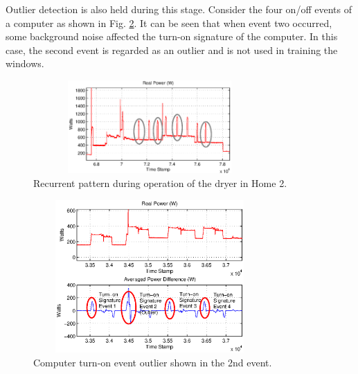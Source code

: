 \documentclass[conference]{IEEEtran}
\begin{document}
Outlier detection is also held during this stage.  Consider the four on/off events of a computer as shown in Fig. \ref{fig:outlier}.  It can be seen that when event two occurred, some background noise affected the turn-on signature of the computer.  In this case, the second event is regarded as an outlier and is not used in training the windows.  

\begin{figure}[!t]
	\centering
	\includegraphics[height = 1.4in, width=3.5in]{fig/dryerH2.eps}
	\caption{Recurrent pattern during operation of the dryer in Home 2.}
	\label{fig:dryerH2}
\end{figure}
	
\begin{figure}[!t]
	\centering
	\includegraphics[height = 2.3in, width=3.5in]{fig/outlier.eps}
	\caption{Computer turn-on event outlier shown in the 2nd event.}
	\label{fig:outlier}
\end{figure}
%
\end{document}
